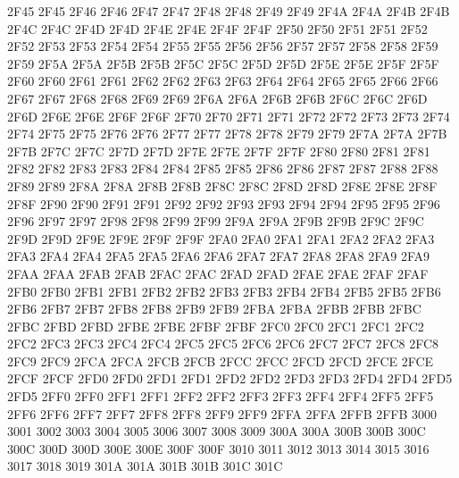 \ID 2F45 2F45
\ID 2F46 2F46
\ID 2F47 2F47
\ID 2F48 2F48
\ID 2F49 2F49
\ID 2F4A 2F4A
\ID 2F4B 2F4B
\ID 2F4C 2F4C
\ID 2F4D 2F4D
\ID 2F4E 2F4E
\ID 2F4F 2F4F
\ID 2F50 2F50
\ID 2F51 2F51
\ID 2F52 2F52
\ID 2F53 2F53
\ID 2F54 2F54
\ID 2F55 2F55
\ID 2F56 2F56
\ID 2F57 2F57
\ID 2F58 2F58
\ID 2F59 2F59
\ID 2F5A 2F5A
\ID 2F5B 2F5B
\ID 2F5C 2F5C
\ID 2F5D 2F5D
\ID 2F5E 2F5E
\ID 2F5F 2F5F
\ID 2F60 2F60
\ID 2F61 2F61
\ID 2F62 2F62
\ID 2F63 2F63
\ID 2F64 2F64
\ID 2F65 2F65
\ID 2F66 2F66
\ID 2F67 2F67
\ID 2F68 2F68
\ID 2F69 2F69
\ID 2F6A 2F6A
\ID 2F6B 2F6B
\ID 2F6C 2F6C
\ID 2F6D 2F6D
\ID 2F6E 2F6E
\ID 2F6F 2F6F
\ID 2F70 2F70
\ID 2F71 2F71
\ID 2F72 2F72
\ID 2F73 2F73
\ID 2F74 2F74
\ID 2F75 2F75
\ID 2F76 2F76
\ID 2F77 2F77
\ID 2F78 2F78
\ID 2F79 2F79
\ID 2F7A 2F7A
\ID 2F7B 2F7B
\ID 2F7C 2F7C
\ID 2F7D 2F7D
\ID 2F7E 2F7E
\ID 2F7F 2F7F
\ID 2F80 2F80
\ID 2F81 2F81
\ID 2F82 2F82
\ID 2F83 2F83
\ID 2F84 2F84
\ID 2F85 2F85
\ID 2F86 2F86
\ID 2F87 2F87
\ID 2F88 2F88
\ID 2F89 2F89
\ID 2F8A 2F8A
\ID 2F8B 2F8B
\ID 2F8C 2F8C
\ID 2F8D 2F8D
\ID 2F8E 2F8E
\ID 2F8F 2F8F
\ID 2F90 2F90
\ID 2F91 2F91
\ID 2F92 2F92
\ID 2F93 2F93
\ID 2F94 2F94
\ID 2F95 2F95
\ID 2F96 2F96
\ID 2F97 2F97
\ID 2F98 2F98
\ID 2F99 2F99
\ID 2F9A 2F9A
\ID 2F9B 2F9B
\ID 2F9C 2F9C
\ID 2F9D 2F9D
\ID 2F9E 2F9E
\ID 2F9F 2F9F
\ID 2FA0 2FA0
\ID 2FA1 2FA1
\ID 2FA2 2FA2
\ID 2FA3 2FA3
\ID 2FA4 2FA4
\ID 2FA5 2FA5
\ID 2FA6 2FA6
\ID 2FA7 2FA7
\ID 2FA8 2FA8
\ID 2FA9 2FA9
\ID 2FAA 2FAA
\ID 2FAB 2FAB
\ID 2FAC 2FAC
\ID 2FAD 2FAD
\ID 2FAE 2FAE
\ID 2FAF 2FAF
\ID 2FB0 2FB0
\ID 2FB1 2FB1
\ID 2FB2 2FB2
\ID 2FB3 2FB3
\ID 2FB4 2FB4
\ID 2FB5 2FB5
\ID 2FB6 2FB6
\ID 2FB7 2FB7
\ID 2FB8 2FB8
\ID 2FB9 2FB9
\ID 2FBA 2FBA
\ID 2FBB 2FBB
\ID 2FBC 2FBC
\ID 2FBD 2FBD
\ID 2FBE 2FBE
\ID 2FBF 2FBF
\ID 2FC0 2FC0
\ID 2FC1 2FC1
\ID 2FC2 2FC2
\ID 2FC3 2FC3
\ID 2FC4 2FC4
\ID 2FC5 2FC5
\ID 2FC6 2FC6
\ID 2FC7 2FC7
\ID 2FC8 2FC8
\ID 2FC9 2FC9
\ID 2FCA 2FCA
\ID 2FCB 2FCB
\ID 2FCC 2FCC
\ID 2FCD 2FCD
\ID 2FCE 2FCE
\ID 2FCF 2FCF
\ID 2FD0 2FD0
\ID 2FD1 2FD1
\ID 2FD2 2FD2
\ID 2FD3 2FD3
\ID 2FD4 2FD4
\ID 2FD5 2FD5
\ID 2FF0 2FF0
\ID 2FF1 2FF1
\ID 2FF2 2FF2
\ID 2FF3 2FF3
\ID 2FF4 2FF4
\ID 2FF5 2FF5
\ID 2FF6 2FF6
\ID 2FF7 2FF7
\ID 2FF8 2FF8
\ID 2FF9 2FF9
\ID 2FFA 2FFA
\ID 2FFB 2FFB
 3000
 3001
 3002
 3003
 3004
 3005
 3006
 3007
 3008
 3009
\OP 300A 300A
\CL 300B 300B
\OP 300C 300C
\CL 300D 300D
\OP 300E 300E
\CL 300F 300F
 3010
 3011
 3012
 3013
 3014
 3015
 3016
 3017
 3018
 3019
\OP 301A 301A
\CL 301B 301B
\NS 301C 301C
